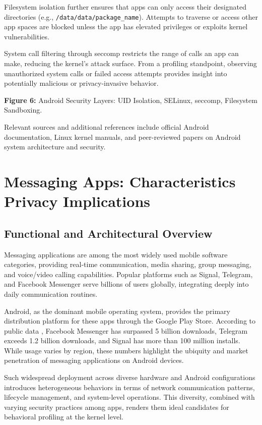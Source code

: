 \documentclass[a4paper,12pt]{report}
\begin{document}
Filesystem isolation further ensures that apps can only access their designated directories (e.g., \texttt{/data/data/{package\_name}}). Attempts to traverse or access other app spaces are blocked unless the app has elevated privileges or exploits kernel vulnerabilities.

System call filtering through seccomp restricts the range of calls an app can make, reducing the kernel's attack surface. From a profiling standpoint, observing unauthorized system calls or failed access attempts provides insight into potentially malicious or privacy-invasive behavior.

\textbf{Figure 6:} Android Security Layers: UID Isolation, SELinux, seccomp, Filesystem Sandboxing.

Relevant sources and additional references include official Android documentation, Linux kernel manuals, and peer-reviewed papers on Android system architecture and security.
\section{Messaging Apps: Characteristics  Privacy Implications}

\subsection{Functional and Architectural Overview}
Messaging applications are among the most widely used mobile software categories, providing real-time communication, media sharing, group messaging, and voice/video calling capabilities. Popular platforms such as Signal, Telegram, and Facebook Messenger serve billions of users globally, integrating deeply into daily communication routines.

Android, as the dominant mobile operating system, provides the primary distribution platform for these apps through the Google Play Store. According to public data \cite{statista2024messaging, googleplaydata2024}, Facebook Messenger has surpassed 5 billion downloads, Telegram exceeds 1.2 billion downloads, and Signal has more than 100 million installs. While usage varies by region, these numbers highlight the ubiquity and market penetration of messaging applications on Android devices.

Such widespread deployment across diverse hardware and Android configurations introduces heterogeneous behaviors in terms of network communication patterns, lifecycle management, and system-level operations. This diversity, combined with varying security practices among apps, renders them ideal candidates for behavioral profiling at the kernel level.
\end{document}
